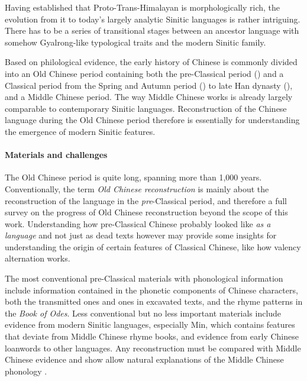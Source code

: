 \documentclass[UTF8, a4paper, oneside, scheme=plain, 12pt]{ctexrep}
\newcommand*{\citechap}[1]{Ch.~{#1}}
\newcommand*{\term}[1]{\emph{#1}}
\newcommand{\work}[1]{\textit{#1}}
\begin{document}
Having established that Proto-Trans-Himalayan is morphologically rich,
the evolution from it to today's largely analytic Sinitic languages is rather intriguing.
There has to be a series of transitional stages between an ancestor language with somehow Gyalrong-like typological traits and the modern Sinitic family.

Based on philological evidence, the early history of Chinese is commonly divided into 
an Old Chinese period containing both the pre-Classical period ()
and a Classical period from the Spring and Autumn period ()
to late Han dynasty (), and a Middle Chinese period.
The way Middle Chinese works is already largely comparable to contemporary Sinitic languages.
Reconstruction of the Chinese language during the Old Chinese period therefore is essentially
for understanding the emergence of modern Sinitic features.

\paragraph*{Materials and challenges}
The Old Chinese period is quite long, spanning more than 1,000 years.
Conventionally, the term \term{Old Chinese reconstruction} is mainly about the reconstruction of the language in the \emph{pre}-Classical period,
and therefore a full survey on the progress of Old Chinese reconstruction beyond the scope of this work.
Understanding how pre-Classical Chinese probably looked like \emph{as a language} and not just as dead texts however may provide some insights for understanding the origin of certain features of Classical Chinese, like how valency alternation works.

The most conventional pre-Classical materials with phonological information include 
information contained in the phonetic components of Chinese characters,
both the transmitted ones and ones in excavated texts, and
the rhyme patterns in the \work{Book of Odes}.
Less conventional but no less important materials include evidence from modern Sinitic languages,
especially Min, which contains features that deviate from Middle Chinese rhyme books,
and evidence from early Chinese loanwords to other languages.
Any reconstruction must be compared with Middle Chinese evidence
and show allow natural explanations of the Middle Chinese phonology
\citep[\citechap{2}]{baxter2014old}.
\end{document}
